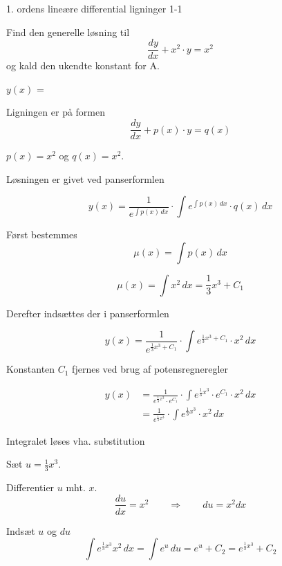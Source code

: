 \documentclass{article}
\begin{document}
\tableofcontents
\newpage

\begin{exercise}{1. ordens lineære differential ligninger 1-1}


Find den generelle løsning til
\[
\frac{dy}{dx} + x^2 \cdot y = x^2
\]
og kald den ukendte konstant for A.

$y(x)$ =  



\hint

Ligningen er på formen
\[
\frac{dy}{dx} + p(x) \cdot y = q(x)
\]

\hint

$p(x)=x^2$ og $q(x)=x^2$.

\hint

Løsningen er givet ved panserformlen


\hint

\[
y(x) = \frac{1}{e^{\int p(x) \, dx}} \cdot \int e^{\int p(x) \, dx}  \cdot q(x) \, dx
\]

\hint

Først bestemmes 
\[
\mu(x) = \int p(x) \, dx
\]

\hint
\[
\mu(x) = \int x^2 \, dx = \frac{1}{3} x^3 + C_1
\]

\hint
Derefter indsættes der i  panserformlen

\hint

\[
y(x) = \frac{1}{e^{\frac{1}{3}x^3 + C_1}} \cdot \int e^{\frac{1}{3}x^3 + C_1}  \cdot x^2 \, dx
\]


\hint

Konstanten $C_1$ fjernes ved brug af potensregneregler

\hint
\begin{align*}
y(x) &= \frac{1}{e^{\frac{1}{3}x^3} \cdot e^{C_1}} \cdot \int e^{\frac{1}{3}x^3} \cdot e^{C_1}  \cdot x^2 \, dx  \\
	   &= \frac{1}{e^{\frac{1}{3}x^3}} \cdot \int e^{\frac{1}{3}x^3}  \cdot x^2 \, dx
\end{align*}

\hint

Integralet løses vha. substitution


\hint
Sæt $u = \frac{1}{3}x^3$.

\hint

Differentier $u$ mht. $x$.
\[
\frac{du}{dx} = x^2 \qquad	\Rightarrow \qquad du = x^2 dx
\]

\hint 
Indsæt $u$ og $du$
\[
\int e^{\frac{1}{3}x^3}x^2 \, dx = \int e^{u} \, du = e^{u} + C_2 = e^{\frac{1}{3}x^3} + C_2
\]


\end{exercise}
\end{document}
